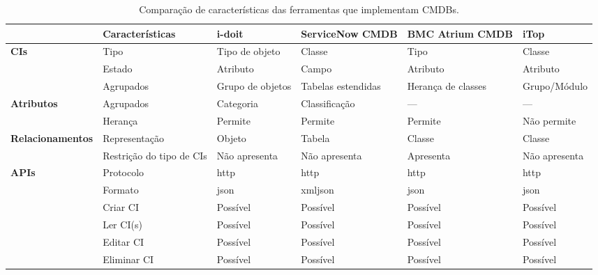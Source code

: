 \documentclass[
  oneside,
  11pt, a4paper,
  footinclude=true,
  headinclude=true,
  cleardoublepage=empty
]{scrbook}
\begin{document}
\fontsize{8}{8}\selectfont 
\begin{longtable}[c]{|m{2.2cm}|m{2.2cm}|m{2cm}|m{2cm}|m{2cm}|m{2cm}|}
\caption{Comparação de características das ferramentas que implementam CMDBs.}
\label{tab:ferramentascmdb}\\
\hline
 & \textbf{Características} & \textbf{i-doit} & \textbf{ServiceNow CMDB} & \textbf{BMC Atrium CMDB} & \textbf{iTop} \\ \hline
\endfirsthead
%
\endhead
%
\multirow{3}{*}{\textbf{CIs}} & Tipo & Tipo de \newline objeto & Classe & Tipo & Classe \\ \cline{2-6} 
 & Estado & Atributo & Campo & Atributo & Atributo \\ \cline{2-6} 
 & Agrupados & Grupo de \newline objetos & Tabelas \newline estendidas & Herança de \newline classes & Grupo/Módulo \\ \hline
\multirow{2}{*}{\textbf{Atributos}} & Agrupados & Categoria & Classificação & --- & --- \\ \cline{2-6} 
 & Herança & Permite & Permite & Permite & Não permite \\ \hline
\multirow{2}{*}{\textbf{Relacionamentos}} & Representação & Objeto & Tabela & Classe & Classe \\ \cline{2-6} 
 & Restrição do tipo de CIs & Não apresenta & Não apresenta & Apresenta & Não apresenta \\ \hline
\multirow{6}{*}{\textbf{APIs}} & Protocolo & \gls{http} & \gls{http} & \gls{http} & \gls{http} \\ \cline{2-6} 
 & Formato & \gls{json} & \gls{xml}\newline \gls{json} & \gls{json} & \gls{json} \\ \cline{2-6} 

 
 & Criar CI & Possível & Possível & Possível & Possível \\ \cline{2-6} 
 & Ler CI(s) & Possível & Possível & Possível & Possível \\ \cline{2-6} 
 & Editar CI & Possível & Possível & Possível & Possível \\ \cline{2-6} 
 & Eliminar CI & Possível & Possível & Possível & Possível \\ 
 \hline
\end{longtable}
\end{document}
